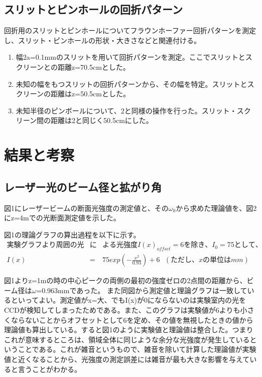 \documentclass[11pt,a4j]{jsarticle}
\begin{document}
  
  \subsection{スリットとピンホールの回折パターン}
  回折用のスリットとピンホールについてフラウンホーファー回折パターンを測定し、スリット・ピンホールの形状・大きさなどと関連付ける。
  \begin{enumerate}
   \item 幅2a=0.1mmのスリットを用いて回折パターンを測定。ここでスリットとスクリーンとの距離z=70.5cmとした。
   \item 未知の幅をもつスリットの回折パターンから、その幅を特定。スリットとスクリーンの距離はz=50.5cmとした。
   \item 未知半径のピンボールについて、2と同様の操作を行った。スリット・スクリーン間の距離は2と同じく50.5cmにした。
  \end{enumerate}

  
  
  
 \section{結果と考察}
  \subsection{レーザー光のビーム径と拡がり角}
  図1にレーザービームの断面光強度の測定値と、その$\omega_0$から求めた理論値を、図2にz=4mでの光断面測定値を示した。

  図1の理論グラフの算出過程を以下に示す。
  \begin{eqnarray}
実験グラフより周囲の光&に&よる光強度I(x)_{offset} = 6を除き、I_0=75として、 \nonumber \\
I(x) &=& 75 exp(- \frac{ x^2}{0.93}) +6 \ \ \  (ただし、xの単位はmm) \nonumber 
  \end{eqnarray}
  
  図1よりz=1mの時の中心ピークの両側の最初の強度ゼロの2点間の距離から、ビーム径は$\omega$=0.963mmであった。
  また同図から測定値と理論グラフは一致しているといってよい。測定値がx=大、でもI(x)が0にならないのは実験室内の光をCCDが検知してしまったためである。また、このグラフは実験値が6よりも小さくならないことからオフセットとして6を定め、その値を無視したときの値から理論値も算出している。すると図1のように実験値と理論値は整合した。つまりこれが意味するところは、領域全体に同じような余分な光強度が発生しているということである。これが雑音というもので、雑音を除いて計算した理論値が実験値と近くなることから、光強度の測定誤差には雑音が最も大きな影響を与えていると言うことがわかる。
  
\end{document}
